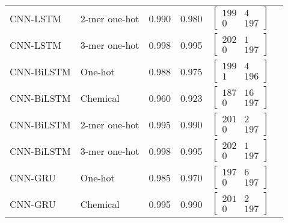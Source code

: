 \begin{longtable}{llllll}
    CNN-LSTM & 2-mer one-hot & 0.990 & 0.980 &
    $\begin{bmatrix}
        199 & 4\\ 
        0 & 197
    \end{bmatrix}$
    \\

    CNN-LSTM & 3-mer one-hot & 0.998 & 0.995 &
    $\begin{bmatrix}
        202 & 1\\ 
        0 & 197
    \end{bmatrix}$
    \\\midrule


    CNN-BiLSTM & One-hot & 0.988 & 0.975 &
    $\begin{bmatrix}
        199 & 4\\ 
        1 & 196
    \end{bmatrix}$
    \\

    CNN-BiLSTM & Chemical & 0.960 & 0.923 &
    $\begin{bmatrix}
        187 & 16\\
        0 & 197
    \end{bmatrix}$
    \\

    CNN-BiLSTM & 2-mer one-hot & 0.995 & 0.990 &
    $\begin{bmatrix}
        201 & 2\\ 
        0 & 197
    \end{bmatrix}$
    \\

    CNN-BiLSTM & 3-mer one-hot & 0.998 & 0.995 &
    $\begin{bmatrix}
        202 & 1\\ 
        0 & 197
    \end{bmatrix}$
    \\\midrule


    CNN-GRU & One-hot & 0.985 & 0.970 &
    $\begin{bmatrix}
        197 & 6\\ 
        0 & 197
    \end{bmatrix}$
    \\

    CNN-GRU & Chemical & 0.995 & 0.990 &
    $\begin{bmatrix}
        201 & 2\\ 
        0 & 197
    \end{bmatrix}$
    \\


\end{longtable}
